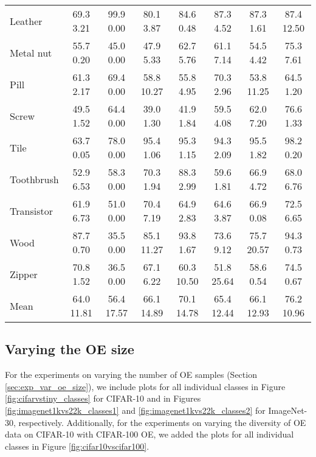 \documentclass[10pt]{article} \usepackage[accepted]{stylefiles/tmlr}
\begin{document}
\begin{table*}[th]
{\begin{tabular}{lccccccc}
Leather & 69.3  3.21 & \multicolumn{1}{c|}{99.9  0.00} & 80.1  3.87 & \multicolumn{1}{c|}{84.6  0.48} & 87.3  4.52 & 87.3  1.61 & \multicolumn{1}{c}{87.4  12.50} \\
Metal nut & 55.7  0.20 & \multicolumn{1}{c|}{45.0  0.00} & 47.9  5.33 & \multicolumn{1}{c|}{62.7  5.76} & 61.1  7.14 & 54.5  4.42 & \multicolumn{1}{c}{75.3  7.61} \\
Pill & 61.3  2.17 & \multicolumn{1}{c|}{69.4  0.00} & 58.8  10.27 & \multicolumn{1}{c|}{55.8  4.95} & 70.3  2.96 & 53.8  11.25 & \multicolumn{1}{c}{64.5  1.20} \\
Screw & 49.5  1.52 & \multicolumn{1}{c|}{64.4  0.00} & 39.0  1.30 & \multicolumn{1}{c|}{41.9  1.84} & 59.5  4.08 & 62.0  7.20 & \multicolumn{1}{c}{76.6  1.33} \\
Tile & 63.7  0.05 & \multicolumn{1}{c|}{78.0  0.00} & 95.4  1.06 & \multicolumn{1}{c|}{95.3  1.15} & 94.3  2.09 & 95.5  1.82 & \multicolumn{1}{c}{98.2  0.20} \\
Toothbrush & 52.9  6.53 & \multicolumn{1}{c|}{58.3  0.00} & 70.3  1.94 & \multicolumn{1}{c|}{88.3  2.99} & 59.6  1.81 & 66.9  4.72 & \multicolumn{1}{c}{68.0  6.76} \\
Transistor & 61.9  6.73 & \multicolumn{1}{c|}{51.0  0.00} & 70.4  7.19 & \multicolumn{1}{c|}{64.9  2.83} & 64.6  3.87 & 66.9  0.08 & \multicolumn{1}{c}{72.5  6.65} \\
Wood & 87.7  0.70 & \multicolumn{1}{c|}{35.5  0.00} & 85.1  11.27 & \multicolumn{1}{c|}{93.8  1.67} & 73.6  9.12 & 75.7  20.57 & \multicolumn{1}{c}{94.3  0.73} \\
Zipper & 70.8  1.52 & \multicolumn{1}{c|}{36.5  0.00} & 67.1  6.22 & \multicolumn{1}{c|}{60.3  10.50} & 51.8  25.64 & 58.6  0.54 & \multicolumn{1}{c}{74.5  0.67} \\
\midrule
Mean & 64.0  11.81 & \multicolumn{1}{c|}{56.4  17.57} & 66.1  14.89 & \multicolumn{1}{c|}{70.1  14.78} & 65.4  12.44 & 66.1  12.93 & \multicolumn{1}{c}{76.2  10.96} \\
\bottomrule
\end{tabular}
     }
\end{table*}






\clearpage



\clearpage
\subsection{Varying the OE size}
For the experiments on varying the number of OE samples (Section \ref{sec:exp_var_oe_size}), we include plots for all individual classes in Figure \ref{fig:cifarvstiny_classes} for CIFAR-10 and in Figures \ref{fig:imagenet1kvs22k_classes1} and \ref{fig:imagenet1kvs22k_classes2} for ImageNet-30, respectively.
Additionally, for the experiments on varying the diversity of OE data on CIFAR-10 with CIFAR-100 OE, we added the plots for all individual classes in Figure \ref{fig:cifar10vscifar100}.
\end{document}
